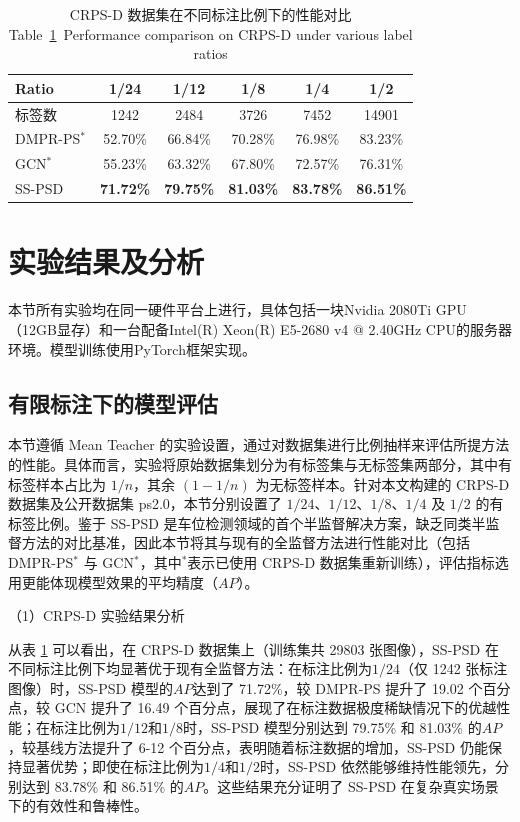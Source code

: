 \begin{table}[!b]
\centering
\setlength{\tabcolsep}{4.5mm}
\caption{CRPS-D 数据集在不同标注比例下的性能对比\\
Table~\ref{tab_crpsd}~Performance comparison on CRPS-D under various label ratios}
\begin{tabular}{lccccc}
\toprule
Ratio & 1/24 & 1/12 & 1/8  & 1/4  & 1/2 \\
\midrule
  标签数 & 1242  & 2484  & 3726 & 7452  & 14901  \\
\midrule
DMPR-PS$^{*}$\cite{huang2019dmpr}  & 52.70\% & 66.84\% & 70.28\% & 76.98\% & 83.23\% \\
GCN$^{*}$\cite{min2021attentional}   & 55.23\% & 63.32\% & 67.80\% & 72.57\% & 76.31\%  \\
SS-PSD & \textbf{71.72\%} & \textbf{79.75\%} & \textbf{81.03\%} & \textbf{83.78\%}  & \textbf{86.51\%}  \\
\bottomrule
\end{tabular}
\label{tab_crpsd}
\end{table}

\section{实验结果及分析}
本节所有实验均在同一硬件平台上进行，具体包括一块Nvidia 2080Ti GPU（12GB显存）和一台配备Intel(R) Xeon(R) E5-2680 v4 @ 2.40GHz CPU的服务器环境。模型训练使用PyTorch框架实现。

\subsection{有限标注下的模型评估}

本节遵循 Mean Teacher\cite{tarvainen2017mean} 的实验设置，通过对数据集进行比例抽样来评估所提方法的性能。具体而言，实验将原始数据集划分为有标签集与无标签集两部分，其中有标签样本占比为 $1/n$，其余 $(1 - 1/n)$ 为无标签样本。针对本文构建的 CRPS-D 数据集及公开数据集 ps2.0，本节分别设置了 $1/24$、$1/12$、$1/8$、$1/4$ 及 $1/2$ 的有标签比例。鉴于 SS-PSD 是车位检测领域的首个半监督解决方案，缺乏同类半监督方法的对比基准，因此本节将其与现有的全监督方法进行性能对比（包括 DMPR-PS$^{*}$ 与 GCN$^{*}$，其中$^{*}$表示已使用 CRPS-D 数据集重新训练），评估指标选用更能体现模型效果的平均精度（\(AP\)）。

（1）CRPS-D 实验结果分析

从表 \ref{tab_crpsd} 可以看出，在 CRPS-D 数据集上（训练集共 29803 张图像），SS-PSD 在不同标注比例下均显著优于现有全监督方法：在标注比例为\(1/24\)（仅 1242 张标注图像）时，SS-PSD 模型的\(AP\)达到了 71.72\%，较 DMPR-PS\cite{huang2019dmpr} 提升了 19.02 个百分点，较 GCN 提升了 16.49 个百分点，展现了在标注数据极度稀缺情况下的优越性能；在标注比例为\(1/12\)和\(1/8\)时，SS-PSD 模型分别达到 79.75\% 和 81.03\% 的\(AP\)，较基线方法提升了 6-12 个百分点，表明随着标注数据的增加，SS-PSD 仍能保持显著优势；即使在标注比例为\(1/4\)和\(1/2\)时，SS-PSD 依然能够维持性能领先，分别达到 83.78\% 和 86.51\% 的\(AP\)。这些结果充分证明了 SS-PSD 在复杂真实场景下的有效性和鲁棒性。


